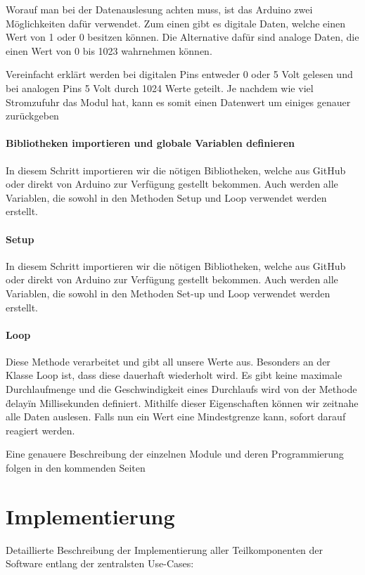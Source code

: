 Worauf man bei der Datenauslesung achten muss, ist das Arduino zwei Möglichkeiten dafür verwendet. Zum einen gibt es digitale Daten, welche einen Wert von 1 oder 0 besitzen können. Die Alternative dafür sind analoge Daten, die einen Wert von 0 bis 1023 wahrnehmen können.

Vereinfacht erklärt werden bei digitalen Pins entweder 0 oder 5 Volt gelesen und bei analogen Pins 5 Volt durch 1024 Werte geteilt. Je nachdem wie viel Stromzufuhr das Modul hat, kann es somit einen Datenwert um einiges genauer zurückgeben
\cite{analogRead}




\subsubsection{Bibliotheken importieren und globale Variablen definieren}

In diesem Schritt importieren wir die nötigen Bibliotheken, welche aus GitHub oder direkt von Arduino zur Verfügung gestellt bekommen. Auch werden alle Variablen, die sowohl in den Methoden Setup und Loop verwendet werden erstellt. 

\subsubsection{Setup}

In diesem Schritt importieren wir die nötigen Bibliotheken, welche aus GitHub oder direkt von Arduino zur Verfügung gestellt bekommen. Auch werden alle Variablen, die sowohl in den Methoden Set-up und Loop verwendet werden erstellt.  

\subsubsection{Loop}

Diese Methode verarbeitet und gibt all unsere Werte aus. Besonders an der Klasse Loop ist, dass diese dauerhaft wiederholt wird. Es gibt keine maximale Durchlaufmenge und die Geschwindigkeit eines Durchlaufs wird von der Methode \"delay\" in Millisekunden definiert. Mithilfe dieser Eigenschaften können wir zeitnahe alle Daten auslesen. Falls nun ein Wert eine Mindestgrenze kann, sofort darauf reagiert werden. 

Eine genauere Beschreibung der einzelnen Module und deren Programmierung folgen in den kommenden Seiten


\chapter{Implementierung}
Detaillierte Beschreibung der Implementierung aller Teilkomponenten der Software entlang der zentralsten Use-Cases:

